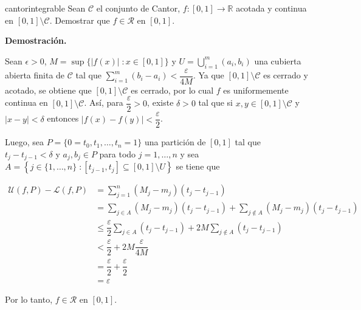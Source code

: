 \documentclass[12pt]{article}
\newenvironment{ejercicio}[1]{\begin{ejer}[breakable, pad at break = 5mm, leftrule = 0.7mm, rightrule = 0.7mm, right = 2mm, left = 2mm, enlarge bottom finally by = 3mm, fontlower = \setlength{\parskip}{2mm}]{}{#1}}{\end{ejer}}
\newcommand{\talque}{\; \mathbf{\colon}}
\newcommand{\real}{\mathbb{R}}
\begin{document}
	\begin{ejercicio}{cantorintegrable}
		Sean $ \mathcal{C} $ el conjunto de Cantor, $ f \colon [0,1] \to \real $ acotada y continua en $ [0,1] \setminus \mathcal{C} $. Demostrar que $ f \in \mathcal{R} $ en $ [0,1] $.

		\tcblower

		\textbf{Demostración.}

		Sean $ \epsilon > 0 $, $ M = \sup \bigl\lbrace \lvert f(x) \rvert \talque x \in [0,1] \bigr\rbrace $ y $ \displaystyle U = \bigcup_{i=1}^m (a_i, b_i) $ una cubierta abierta finita de $ \mathcal{C} $ tal que $ \displaystyle \sum_{i=1}^{m} (b_i - a_i) < \dfrac{\varepsilon}{4M} $. Ya que $ [0,1] \setminus \mathcal{C} $ es cerrado y acotado, se obtiene que $ [0,1] \setminus \mathcal{C} $ es cerrado, por lo cual $ f $ es uniformemente continua en $ [0,1] \setminus \mathcal{C} $. Así, para $ \dfrac{\varepsilon}{2} > 0 $, existe $ \delta > 0 $ tal que si $ x, y \in [0,1] \setminus \mathcal{C} $ y $ \lvert x - y \rvert < \delta $ entonces $ \lvert f(x) - f(y) \rvert < \dfrac{\varepsilon}{2} $.

		Luego, sea $ P = \lbrace 0 = t_0, t_1, \ldots, t_n = 1 \rbrace $ una partición de $ [0,1] $ tal que $ t_j - t_{j-1} < \delta $ y $ a_j, b_j \in P $ para todo $ j = 1, \ldots, n $ y sea $ A = \left\lbrace j \in \lbrace 1, \ldots, n \rbrace \talque [t_{j-1}, t_j] \subseteq [0,1] \setminus U \right\rbrace $ se tiene que 

		\begin{align*}
			\mathcal{U} (f, P) - \mathcal{L} (f, P) &= \sum_{j=1}^{n} (M_j - m_j)(t_j - t_{j-1}) \\
			&= \sum_{j \in A} (M_j - m_j)(t_j - t_{j-1}) + \sum_{j \notin A} (M_j - m_j)(t_j - t_{j-1}) \\
			&\leq \dfrac{\varepsilon}{2} \sum_{j \in A} (t_j - t_{j-1}) + 2M \sum_{j \notin A} (t_j - t_{j-1}) \\
			&< \dfrac{\varepsilon}{2} + 2M \dfrac{\varepsilon}{4M} \\
			&= \dfrac{\varepsilon}{2} + \dfrac{\varepsilon}{2} \\
			&= \varepsilon
		\end{align*}

		Por lo tanto, $ f \in \mathcal{R} $ en $ [0,1] $.
	\end{ejercicio}

\end{document}
